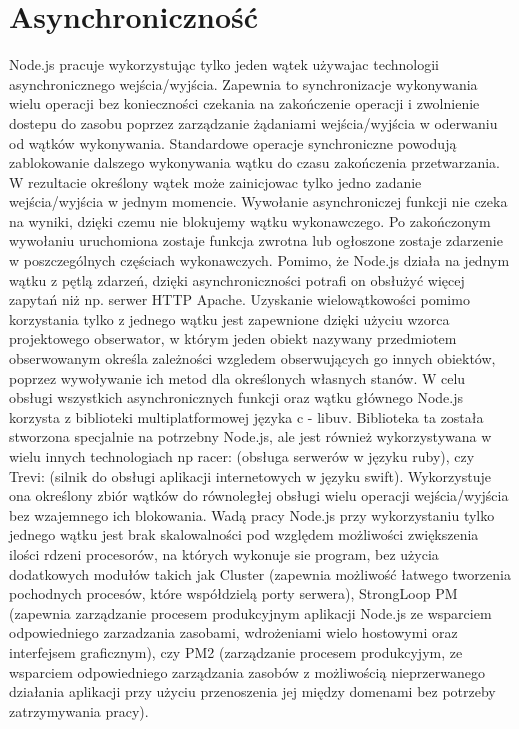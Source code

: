 \documentclass[12pt]{report}
\begin{document}
\section{Asynchroniczność}
Node.js pracuje wykorzystując tylko jeden wątek używajac technologii asynchronicznego wejścia/wyjścia. 
Zapewnia to synchronizacje wykonywania wielu operacji bez konieczności czekania na zakończenie operacji i zwolnienie dostepu do zasobu poprzez zarządzanie żądaniami wejścia/wyjścia w oderwaniu od wątków wykonywania. 
Standardowe operacje synchroniczne powodują zablokowanie dalszego wykonywania wątku do czasu zakończenia przetwarzania. 
W rezultacie określony wątek może zainicjowac tylko jedno zadanie wejścia/wyjścia w jednym momencie. 
Wywołanie asynchroniczej funkcji nie czeka na wyniki, dzięki czemu nie blokujemy wątku wykonawczego. 
Po zakończonym wywołaniu uruchomiona zostaje funkcja zwrotna lub ogłoszone zostaje zdarzenie w poszczególnych częściach wykonawczych. 
Pomimo, że Node.js działa na jednym wątku z pętlą zdarzeń, dzięki asynchroniczności potrafi on obsłużyć więcej zapytań niż np. serwer HTTP Apache. 
Uzyskanie wielowątkowości pomimo korzystania tylko z jednego wątku jest zapewnione dzięki użyciu wzorca projektowego obserwator, w którym jeden obiekt nazywany przedmiotem obserwowanym określa zależności wzgledem obserwujących go innych obiektów, poprzez wywoływanie ich metod dla określonych własnych stanów. 
W celu obsługi wszystkich asynchronicznych funkcji oraz wątku głównego Node.js korzysta z biblioteki multiplatformowej języka c - libuv. 
Biblioteka ta została stworzona specjalnie na potrzebny Node.js, ale jest również wykorzystywana w wielu innych technologiach np racer: (obsługa serwerów w języku ruby), czy Trevi: (silnik do obsługi aplikacji internetowych w języku swift). 
Wykorzystuje ona określony zbiór wątków do równoległej obsługi wielu operacji wejścia/wyjścia bez wzajemnego ich blokowania. 
Wadą pracy Node.js przy wykorzystaniu tylko jednego wątku jest brak skalowalności pod względem możliwości zwiększenia ilości rdzeni procesorów, na których wykonuje sie program, bez użycia dodatkowych modułów takich jak Cluster (zapewnia możliwość łatwego tworzenia pochodnych procesów, które współdzielą porty serwera), StrongLoop PM (zapewnia zarządzanie procesem produkcyjnym aplikacji Node.js ze wsparciem odpowiedniego zarzadzania zasobami, wdrożeniami wielo hostowymi oraz interfejsem graficznym), czy PM2 (zarządzanie procesem produkcyjym, ze wsparciem odpowiedniego zarządzania zasobów z możliwością nieprzerwanego działania aplikacji przy użyciu przenoszenia jej między domenami bez potrzeby zatrzymywania pracy). 
\end{document}
